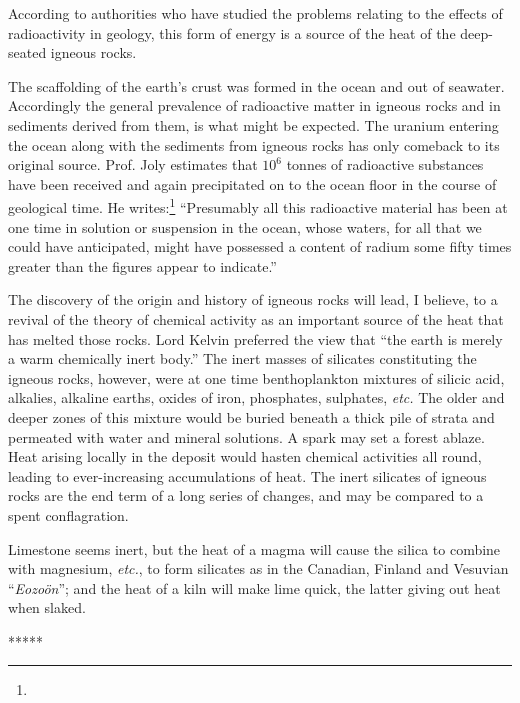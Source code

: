 \documentclass[a4paper, 12pt, oneside]{article}
\begin{document}
According to authorities who have studied the problems relating to the effects of radioactivity in geology, this form of energy is a source of the heat of the deep-seated igneous rocks.

The scaffolding of the earth's crust was formed in the ocean and out of seawater. Accordingly the general prevalence of radioactive matter in igneous rocks and in sediments derived from them, is what might be expected. The uranium entering the ocean along with the sediments from igneous rocks has only comeback to its original source. Prof. Joly estimates that $10^{6}$ tonnes of radioactive substances have been received and again precipitated on to the ocean floor in the course of geological time. He writes:\footnote{} ``Presumably all this radioactive material has been at one time in solution or suspension in the ocean, whose waters, for all that we could have anticipated, might have possessed a content of radium some fifty times greater than the figures appear to indicate.''

The discovery of the origin and history of igneous rocks will lead, I believe, to a revival of the theory of chemical activity as an important source of the heat that has melted those rocks. Lord Kelvin preferred the view that ``the earth is merely a warm chemically inert body.'' The inert masses of silicates constituting the igneous rocks, however, were at one time benthoplankton mixtures of silicic acid, alkalies, alkaline earths, oxides of iron, phosphates, sulphates, \emph{etc.} The older and deeper zones of this mixture would be buried beneath a thick pile of strata and permeated with water and mineral solutions. A spark may set a forest ablaze. Heat arising locally in the deposit would hasten chemical activities all round, leading to ever-increasing accumulations of heat. The inert silicates of igneous rocks are the end term of a long series of changes, and may be compared to a spent conflagration.

Limestone seems inert, but the heat of a magma will cause the silica to combine with magnesium, \emph{etc.}, to form silicates as in the Canadian, Finland and Vesuvian ``\emph{Eozoön}''; and the heat of a kiln will make lime quick, the latter giving out heat when slaked.

\centerline{*\hspace{15mm}*\hspace{15mm}*\hspace{15mm}*\hspace{15mm}*}
\bigskip
\end{document}
